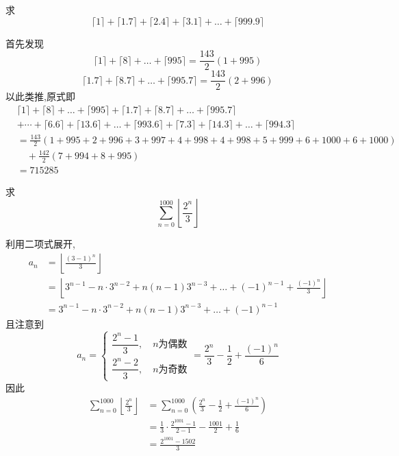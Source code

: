 \begin{questions}
    \question 求
    \[
    \lceil 1\rceil+\lceil 1.7\rceil+\lceil 2.4\rceil+\lceil 3.1\rceil+\dots+\lceil 999.9\rceil
    \]
    \begin{solution}
        首先发现
        \[
        \lceil 1\rceil+\lceil 8\rceil+\dots+\lceil 995\rceil
        =\frac{143}{2}(1+995)
        \]
        \[
        \lceil 1.7\rceil+\lceil 8.7\rceil+\dots+\lceil 995.7\rceil
        =\frac{143}{2}(2+996)
        \]
        以此类推,原式即
        \begin{align}
        &\lceil 1\rceil+\lceil 8\rceil+\dots+\lceil 995\rceil+\lceil 1.7\rceil+\lceil 8.7\rceil+\dots+\lceil 995.7\rceil \\
        &+\cdots + \lceil 6.6\rceil+\lceil 13.6\rceil+\dots+\lceil 993.6\rceil+\lceil 7.3\rceil+\lceil 14.3\rceil+\dots+\lceil 994.3\rceil \\
        &=\frac{143}{2}(1+995+2+996+3+997+4+998+4+998+5+999+6+1000+6+1000)\\
        &\quad+\frac{142}{2}(7+994+8+995)\\
        &=715285
        \end{align}
    \end{solution}

    \question 求
    \[
    \sum_{n=0}^{1000} \left\lfloor \frac{2^n}{3} \right\rfloor
    \]
    \begin{solution}
        利用二项式展开,
        \begin{align}
        a_n &= \left\lfloor \frac{(3-1)^n}{3} \right\rfloor \\
        &= \left\lfloor 3^{n-1} - n \cdot 3^{n-2} + n(n-1)3^{n-3} + \dots + (-1)^{n-1} + \frac{(-1)^n}{3} \right\rfloor \\
        &= 3^{n-1} - n \cdot 3^{n-2} + n(n-1)3^{n-3} + \dots + (-1)^{n-1} 
        \end{align}
        且注意到 
        \[
        a_n 
        = \begin{cases}
        \dfrac{2^n-1}{3}, \quad n\text{为偶数} \\[8pt]
        \dfrac{2^n-2}{3}, \quad n\text{为奇数}
        \end{cases}
        = \frac{2^n}{3} - \frac{1}{2} + \frac{(-1)^n}{6}
        \]
        因此
        \begin{align}
        \sum_{n=0}^{1000} \left\lfloor \frac{2^n}{3} \right\rfloor
        &= \sum_{n=0}^{1000} \left( \frac{2^n}{3} - \frac{1}{2} + \frac{(-1)^n}{6} \right) \\
        &= \frac{1}{3} \cdot \frac{2^{1001}-1}{2-1} - \frac{1001}{2} + \frac{1}{6} \\
        &= \frac{2^{1001}-1502}{3}
        \end{align}
    \end{solution}


\end{questions}

